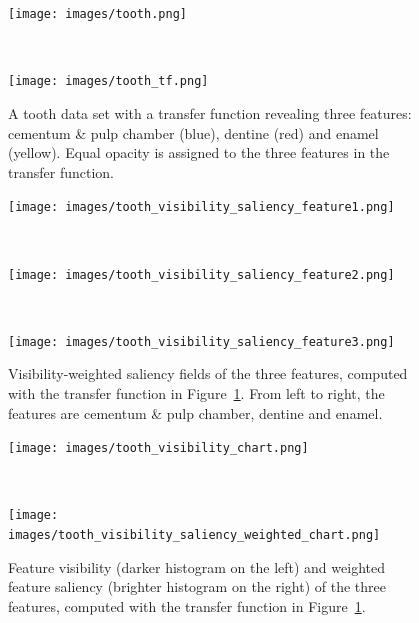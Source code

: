 \begin{figure}
	\centering
	\begin{minipage}{.6\textwidth}
		\texttt{[image: images/tooth.png]}
	\end{minipage}~
	\begin{minipage}{.3\textwidth}
		\texttt{[image: images/tooth\_tf.png]}
	\end{minipage}
	\caption{A tooth data set with a transfer function revealing three features: cementum \& pulp chamber (blue), dentine (red) and enamel (yellow). Equal opacity is assigned to the three features in the transfer function.}
	\label{fig:tooth}
\end{figure}

\begin{figure}
	\centering
	\begin{minipage}{.3\textwidth}
		\texttt{[image: images/tooth\_visibility\_saliency\_feature1.png]}
	\end{minipage}~
	\begin{minipage}{.3\textwidth}
		\texttt{[image: images/tooth\_visibility\_saliency\_feature2.png]}
	\end{minipage}~
	\begin{minipage}{.3\textwidth}
		\texttt{[image: images/tooth\_visibility\_saliency\_feature3.png]}
	\end{minipage}
	\caption{Visibility-weighted saliency fields of the three features, computed with the transfer function in Figure~\ref{fig:tooth}. From left to right, the features are cementum \& pulp chamber, dentine and enamel.}
	\label{fig:tooth_saliency_field}
\end{figure}

\begin{figure}
	\centering
	\begin{minipage}{.45\textwidth}
		\texttt{[image: images/tooth\_visibility\_chart.png]}
	\end{minipage}~
	\begin{minipage}{.45\textwidth}
		\texttt{[image: images/tooth\_visibility\_saliency\_weighted\_chart.png]}
	\end{minipage}
	\caption{Feature visibility (darker histogram on the left) and weighted feature saliency (brighter histogram on the right) of the three features, computed with the transfer function in Figure~\ref{fig:tooth}.}
	\label{fig:tooth_saliency_chart}
\end{figure}

